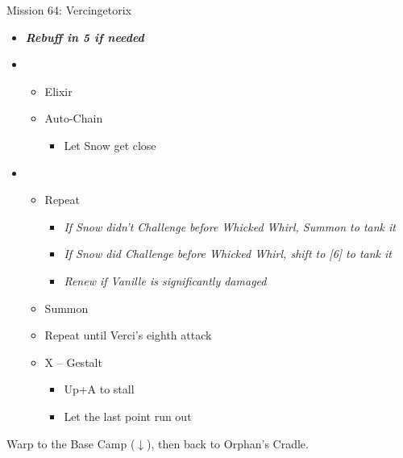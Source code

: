 \begin{battle}{Mission 64: Vercingetorix}
\begin{itemize}
		\item \textit{\textbf{Rebuff in 5 if needed}}
		\item \first
			\begin{itemize}
				\item Elixir
				\item Auto-Chain
					\begin{itemize}
						\item Let Snow get close
					\end{itemize}
			\end{itemize}
		\item \third
			\begin{itemize}
				\item Repeat
					\begin{itemize}
						\item \textit{If Snow didn't Challenge before Whicked Whirl, Summon to tank it}
						\item \textit{If Snow did Challenge before Whicked Whirl, shift to [6] to tank it}
						\item \textit{Renew if Vanille is significantly damaged}
					\end{itemize}
				\item Summon
				\item Repeat until Verci's eighth attack
				\item X -- Gestalt
					\begin{itemize}
						\item Up+A to stall
						\item Let the last point run out
					\end{itemize}
			\end{itemize}
	\end{itemize}
\end{battle}

Warp to the Base Camp ($\downarrow$), then back to Orphan's Cradle.
\vfill\null
\columnbreak
